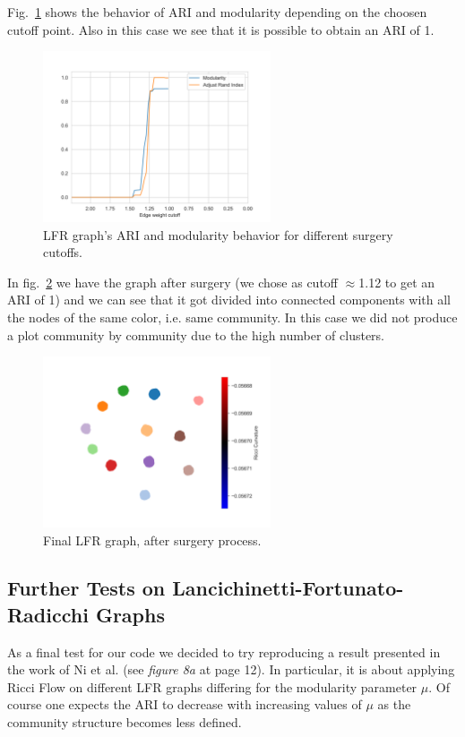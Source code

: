 Fig.~\ref{fig:LFR_Accuracy} shows the behavior of ARI and modularity depending on the choosen cutoff point. Also in this case we see that it is possible to obtain an ARI of 1.
\begin{figure}
    \centering
    \includegraphics[width=0.6\textwidth]{../tests/ToyModelResults/LFR/Surgery Accuracy.png}
    \caption{LFR graph's ARI and modularity behavior for different surgery cutoffs.}
    \label{fig:LFR_Accuracy}
\end{figure}

In fig.~\ref{fig:LFR_Surgery} we have the graph after surgery (we chose as cutoff $\approx$1.12 to get an ARI of 1) and we can see that it got divided into connected components with all the nodes of the same color, i.e. same community. In this case we did not produce a plot community by community due to the high number of clusters. 
\begin{figure}
    \centering
    \includegraphics[width=0.6\textwidth]{../tests/ToyModelResults/LFR/After Surgery.png}
        \caption{Final LFR graph, after surgery process.}
        \label{fig:LFR_Surgery}
\end{figure}

\subsection{Further Tests on Lancichinetti-Fortunato-Radicchi Graphs}
As a final test for our code we decided to try reproducing a result presented in the work of Ni et al. \cite{Ni:communitydetectionnetworksricci} (see \textit{figure 8a} at page 12). In particular, it is about applying Ricci Flow on different LFR graphs differing for the modularity parameter $\mu$. Of course one expects the ARI to decrease with increasing values of $\mu$ as the community structure becomes less defined.

